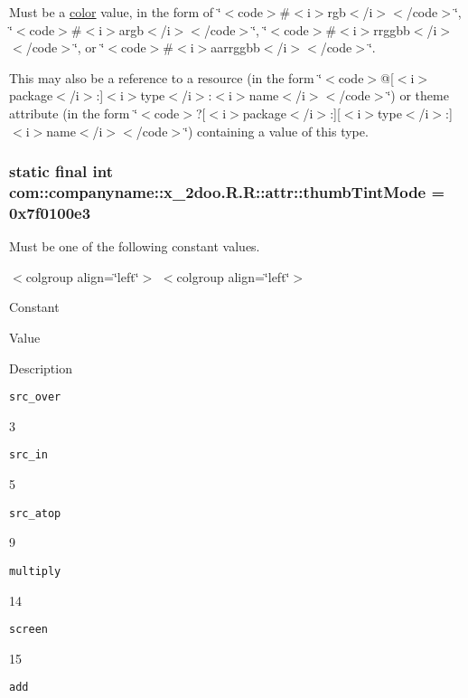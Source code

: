 Must be a \hyperlink{classcom_1_1companyname_1_1x__2doo_1_1_r_1_1color}{color} value, in the form of \char`\"{}$<$code$>$\#$<$i$>$rgb$<$/i$>$$<$/code$>$\char`\"{}, \char`\"{}$<$code$>$\#$<$i$>$argb$<$/i$>$$<$/code$>$\char`\"{}, \char`\"{}$<$code$>$\#$<$i$>$rrggbb$<$/i$>$$<$/code$>$\char`\"{}, or \char`\"{}$<$code$>$\#$<$i$>$aarrggbb$<$/i$>$$<$/code$>$\char`\"{}. 

This may also be a reference to a resource (in the form \char`\"{}$<$code$>$@\mbox{[}$<$i$>$package$<$/i$>$:\mbox{]}$<$i$>$type$<$/i$>$:$<$i$>$name$<$/i$>$$<$/code$>$\char`\"{}) or theme attribute (in the form \char`\"{}$<$code$>$?\mbox{[}$<$i$>$package$<$/i$>$:\mbox{]}\mbox{[}$<$i$>$type$<$/i$>$:\mbox{]}$<$i$>$name$<$/i$>$$<$/code$>$\char`\"{}) containing a value of this type. \hypertarget{classcom_1_1companyname_1_1x__2doo_1_1_r_1_1attr_169fcb550f77b4c98b327a51a75a2c53}{
\subsubsection[{thumbTintMode}]{\setlength{\rightskip}{0pt plus 5cm}static final int com::companyname::x\_\-2doo.R.R::attr::thumbTintMode = 0x7f0100e3}}
\label{classcom_1_1companyname_1_1x__2doo_1_1_r_1_1attr_169fcb550f77b4c98b327a51a75a2c53}


Must be one of the following constant values. \begin{TabularC}{0}
\hline
\end{TabularC}
$<$colgroup align=\char`\"{}left\char`\"{}$>$ $<$colgroup align=\char`\"{}left\char`\"{}$>$ 

Constant

Value

Description 

{\tt src\_\-over}

3

{\tt src\_\-in}

5

{\tt src\_\-atop}

9

{\tt multiply}

14

{\tt screen}

15

{\tt add}

